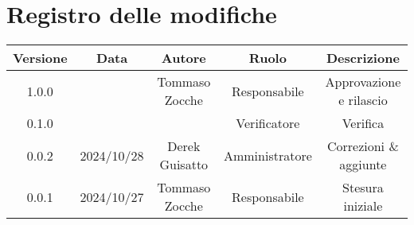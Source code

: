 
\section*{Registro delle modifiche}
\begin{table}[H]
    \begin{tabular}{|c|c|c|c|c|}
        \hline
         \textbf{Versione} &  \textbf{Data} &  \textbf{Autore} &  \textbf{Ruolo} & \textbf{Descrizione} \\
          \hline
         1.0.0&  & Tommaso Zocche & Responsabile & Approvazione e rilascio\\
         \hline
         0.1.0 &   &   & Verificatore & Verifica \\
         \hline
         0.0.2 &  2024/10/28 & Derek Guisatto &  Amministratore & Correzioni \& aggiunte \\
         \hline
         0.0.1 &  2024/10/27 & Tommaso Zocche &  Responsabile & Stesura iniziale \\
         \hline
    \end{tabular}
\end{table}